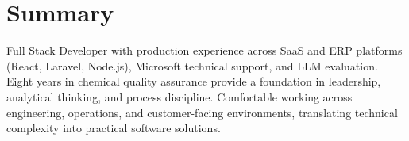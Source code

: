 
\section{Summary}
\vspace{2pt}

\small{
Full Stack Developer with production experience across SaaS and ERP platforms (React, Laravel, Node.js), Microsoft technical support, and LLM evaluation. Eight years in chemical quality assurance provide a foundation in leadership, analytical thinking, and process discipline. Comfortable working across engineering, operations, and customer-facing environments, translating technical complexity into practical software solutions.
}

\vspace{8pt}
